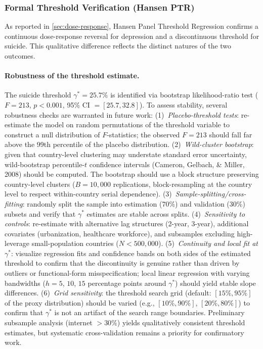 \documentclass[a4paper,11pt,titlepage]{article}
\begin{document}
\subsubsection{Formal Threshold Verification (Hansen PTR)}\label{sec:hansen}

As reported in \cref{sec:dose-response}, Hansen Panel Threshold Regression confirms a continuous dose-response reversal for depression and a discontinuous threshold for suicide. This qualitative difference reflects the distinct natures of the two outcomes.

\paragraph{Robustness of the threshold estimate.}
The suicide threshold $\gamma^* = 25.7\%$ is identified via bootstrap likelihood-ratio test ($F = 213$, $p < 0.001$, 95\% CI $= [25.7, 32.8]$). To assess stability, several robustness checks are warranted in future work: (1)~\textit{Placebo-threshold tests}: re-estimate the model on random permutations of the threshold variable to construct a null distribution of $F$-statistics; the observed $F = 213$ should fall far above the 99th percentile of the placebo distribution. (2)~\textit{Wild-cluster bootstrap}: given that country-level clustering may understate standard error uncertainty, wild-bootstrap percentile-$t$ confidence intervals (Cameron, Gelbach, \& Miller, 2008) should be computed. The bootstrap should use a block structure preserving country-level clusters ($B = 10{,}000$ replications, block-resampling at the country level to respect within-country serial dependence). (3)~\textit{Sample-splitting/cross-fitting}: randomly split the sample into estimation (70\%) and validation (30\%) subsets and verify that $\gamma^*$ estimates are stable across splits. (4)~\textit{Sensitivity to controls}: re-estimate with alternative lag structures (2-year, 3-year), additional covariates (urbanization, healthcare workforce), and subsamples excluding high-leverage small-population countries ($N < 500{,}000$). (5)~\textit{Continuity and local fit at $\gamma^*$}: visualize regression fits and confidence bands on both sides of the estimated threshold to confirm that the discontinuity is genuine rather than driven by outliers or functional-form misspecification; local linear regression with varying bandwidths ($h = 5$, $10$, $15$ percentage points around $\gamma^*$) should yield stable slope differences. (6)~\textit{Grid sensitivity}: the threshold search grid (default: $[15\%, 95\%]$ of the proxy distribution) should be varied (e.g., $[10\%, 90\%]$, $[20\%, 80\%]$) to confirm that $\gamma^*$ is not an artifact of the search range boundaries. Preliminary subsample analysis (internet $> 30\%$) yields qualitatively consistent threshold estimates, but systematic cross-validation remains a priority for confirmatory work.
\end{document}

